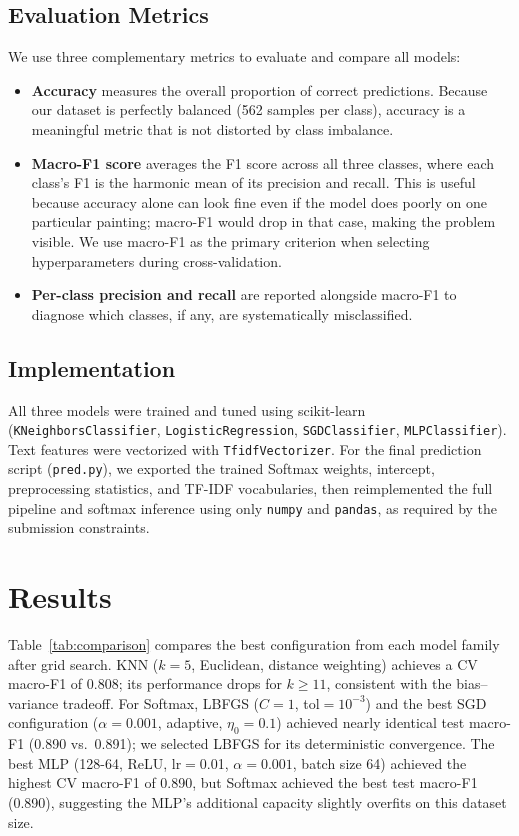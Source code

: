 \documentclass[12pt]{article}
\begin{document}
\subsection{Evaluation Metrics}
We use three complementary metrics to evaluate and compare all models:
\begin{itemize}
    \item \textbf{Accuracy} measures the overall proportion of correct predictions. Because our dataset is perfectly balanced (562 samples per class), accuracy is a meaningful metric that is not distorted by class imbalance.
    \item \textbf{Macro-F1 score} averages the F1 score across all three classes, where each class's F1 is the harmonic mean of its precision and recall. This is useful because accuracy alone can look fine even if the model does poorly on one particular painting; macro-F1 would drop in that case, making the problem visible. We use macro-F1 as the primary criterion when selecting hyperparameters during cross-validation.
    \item \textbf{Per-class precision and recall} are reported alongside macro-F1 to diagnose which classes, if any, are systematically misclassified.
\end{itemize}

\subsection{Implementation}
All three models were trained and tuned using scikit-learn
(\texttt{KNeighbors\-Classifier}, \texttt{Logistic\-Regression},
\texttt{SGD\-Classifier}, \texttt{MLP\-Classifier}).
Text features were vectorized with \texttt{Tfidf\-Vectorizer}.
For the final prediction script (\texttt{pred.py}), we exported the trained
Softmax weights, intercept, preprocessing statistics, and TF-IDF
vocabularies, then reimplemented the full pipeline and softmax inference using
only \texttt{numpy} and \texttt{pandas}, as required by the submission constraints.

\section{Results}\label{sec:results}

Table~\ref{tab:comparison} compares the best configuration from each model family after grid search. KNN ($k{=}5$, Euclidean, distance weighting) achieves a CV macro-F1 of 0.808; its performance drops for $k \geq 11$, consistent with the bias--variance tradeoff. For Softmax, LBFGS ($C{=}1$, tol$=10^{-3}$) and the best SGD configuration ($\alpha{=}0.001$, adaptive, $\eta_0{=}0.1$) achieved nearly identical test macro-F1 (0.890 vs.\ 0.891); we selected LBFGS for its deterministic convergence. The best MLP (128-64, ReLU, lr$=$0.01, $\alpha{=}0.001$, batch size 64) achieved the highest CV macro-F1 of 0.890, but Softmax achieved the best test macro-F1 (0.890), suggesting the MLP's additional capacity slightly overfits on this dataset size.
\end{document}
